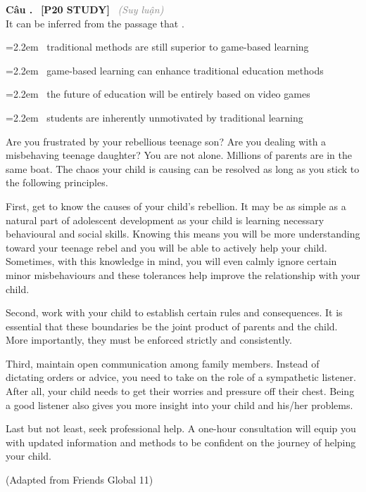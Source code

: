 \documentclass[12pt,a4paper,twoside]{article}
\newcounter{qcounter}
\newcommand{\question}[2][]{%
    \stepcounter{qcounter}%
    \par\vspace{6pt}%
    \noindent\textcolor{primaryBlue}{\textbf{Câu \theqcounter.}}~%
    \textcolor{secondaryBlue}{\small\textbf{[P20 STUDY]}}~%
    \if\relax\detokenize{#1}\relax\else\textcolor{gray}{\small\textit{(#1)}}~\fi\\[1pt]
    \noindent #2%
}
\newcommand{\choiceitem}[2]{%
    \tikz[baseline=-0.5ex]{%
        \node[draw=primaryBlue, circle, minimum size=1.5em, inner sep=0pt, thick] {\textbf{#1}};%
    }~#2%
}
\newenvironment{readingpassage}[1][]{%
    \begin{tcolorbox}[enhanced, colback=grayLight, colframe=secondaryBlue,
        coltitle=textDark, fonttitle=\bfseries, title={#1},
        rounded corners, arc=3mm, boxrule=1pt,
        left=15pt, right=15pt, top=10pt, bottom=10pt,
        breakable, before skip=10pt, after skip=10pt, drop fuzzy shadow]
    \setstretch{1.3}
}{\end{tcolorbox}}
\begin{document}
\question[Suy luận]{It can be inferred from the passage that \underline{\hspace{1.3cm}}.}

\par\vspace{4pt}
\noindent\hangindent=2.2em\choiceitem{A}{traditional methods are still superior to game-based learning}\par\vspace{4pt}
\noindent\hangindent=2.2em\choiceitem{B}{game-based learning can enhance traditional education methods}\par\vspace{4pt}
\noindent\hangindent=2.2em\choiceitem{C}{the future of education will be entirely based on video games}\par\vspace{4pt}
\noindent\hangindent=2.2em\choiceitem{D}{students are inherently unmotivated by traditional learning}\par\vspace{4pt}

\begin{readingpassage}[]
Are you frustrated by your rebellious teenage son? Are you dealing with a misbehaving teenage daughter? You are not alone. Millions of parents are in the same boat. The chaos your child is causing can be resolved as long as you stick to the following principles.

First, get to know the causes of your child’s rebellion. It may be as simple as a natural part of adolescent development as your child is learning necessary behavioural and social skills. Knowing this means you will be more understanding toward your teenage rebel and you will be able to actively help your child. Sometimes, with this knowledge in mind, you will even calmly ignore certain minor misbehaviours and these tolerances help improve the relationship with your child.

Second, work with your child to establish certain rules and consequences. It is essential that these boundaries be the joint product of parents and the child. More importantly, they must be enforced strictly and consistently.

Third, maintain open communication among family members. Instead of dictating orders or advice, you need to take on the role of a sympathetic listener. After all, your child needs to get their worries and pressure off their chest. Being a good listener also gives you more insight into your child and his/her problems.

Last but not least, seek professional help. A one-hour consultation will equip you with updated information and methods to be confident on the journey of helping your child.

(Adapted from Friends Global 11)
\end{readingpassage}
\end{document}
